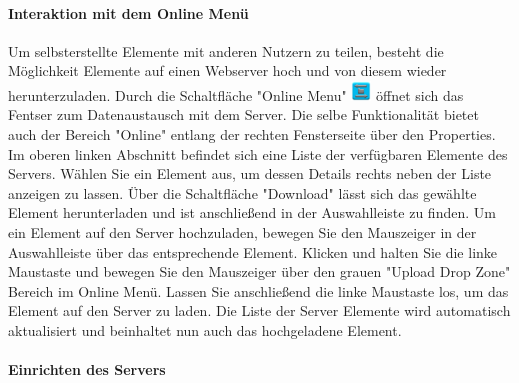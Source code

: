 \paragraph{Interaktion mit dem Online Men\"u}
Um selbsterstellte Elemente mit anderen Nutzern zu teilen, besteht die M\"oglichkeit Elemente auf einen Webserver hoch und von diesem wieder herunterzuladen. Durch die Schaltfl\"ache "Online Menu" \includegraphics[width = 15pt]{Manual/datenaustausch_online} \"offnet sich das Fentser zum Datenaustausch mit dem Server. Die selbe Funktionalit\"at bietet auch der Bereich "Online" entlang der rechten Fensterseite \"uber den Properties. Im oberen linken Abschnitt befindet sich eine Liste der verf\"ugbaren Elemente des Servers. W\"ahlen Sie ein Element aus, um dessen Details rechts neben der Liste anzeigen zu lassen. \"Uber die Schaltfl\"ache "Download" l\"asst sich das gew\"ahlte Element herunterladen und ist anschlie{\ss}end in der Auswahlleiste zu finden. Um ein Element auf den Server hochzuladen, bewegen Sie den Mauszeiger in der Auswahlleiste \"uber das entsprechende Element. Klicken und halten Sie die linke Maustaste und bewegen Sie den Mauszeiger \"uber den grauen "Upload Drop Zone" Bereich im Online Men\"u. Lassen Sie anschlie{\ss}end die linke Maustaste los, um das Element auf den Server zu laden. Die Liste der Server Elemente wird automatisch aktualisiert und beinhaltet nun auch das hochgeladene Element.

\paragraph{Einrichten des Servers}

